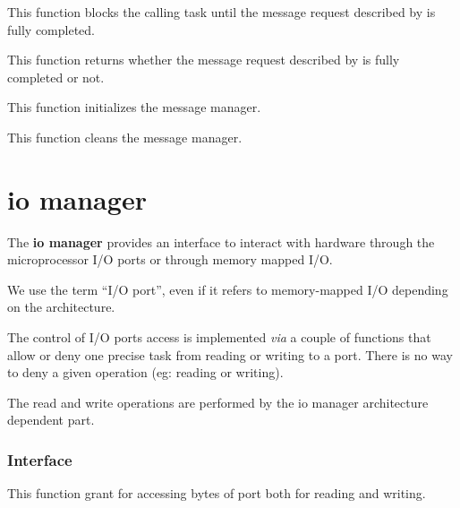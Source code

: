 	 {
	   This function blocks the calling task until the message request
	   described by  is fully completed.

	 }


	 {
	   This function returns whether the message request described
	   by  is fully completed or not.

	 }

	 {
	   This function initializes the message manager.
	 }

	 {
	   This function cleans the message manager.
	 }

%
%

\section{io manager}

The \textbf{io manager} provides an interface to interact with
hardware through the microprocessor I/O ports or through memory mapped
I/O.

We use the term ``I/O port'', even if it refers to memory-mapped I/O
depending on the architecture.

The control of I/O ports access is implemented \textit{via} a couple
of functions that allow or deny one precise task from reading or
writing to a port. There is no way to deny a given operation (eg:
reading or writing).

The read and write operations are performed by the io manager
architecture dependent part.

%
%

\subsubsection{Interface}

	 {
	   This function grant  for accessing
	    bytes of  port both for
	   reading and writing.
	 }

